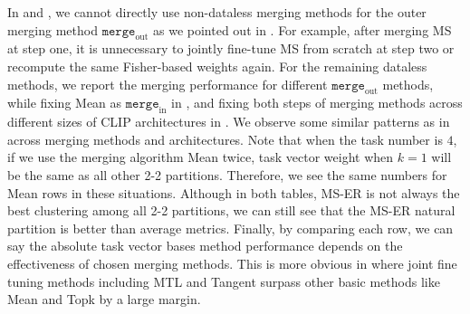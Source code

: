 In  and , we cannot directly use non-dataless merging methods for the outer merging method $\texttt{merge}_\text{out}$ as we pointed out in . For example, after merging MS at step one, it is unnecessary to jointly fine-tune MS from scratch at step two or recompute the same Fisher-based weights again. For the remaining dataless methods, we report the merging performance for different $\texttt{merge}_\text{out}$ methods, while fixing Mean as $\texttt{merge}_\text{in}$ in , and fixing both steps of merging methods across different sizes of CLIP architectures in . We observe some similar patterns as in  across merging methods and architectures. Note that when the task number is $4$, if we use the merging algorithm Mean twice, task vector weight when $k = 1$ will be the same as all other 2-2 partitions. Therefore, we see the same numbers for Mean rows in these situations. Although in both tables, MS-ER is not always the best clustering among all 2-2 partitions, we can still see that the MS-ER natural partition is better than average metrics. Finally, by comparing each row, we can say the absolute task vector bases method performance depends on the effectiveness of chosen merging methods. This is more obvious in  where joint fine tuning methods including MTL and Tangent surpass other basic methods like Mean and Topk by a large margin.


